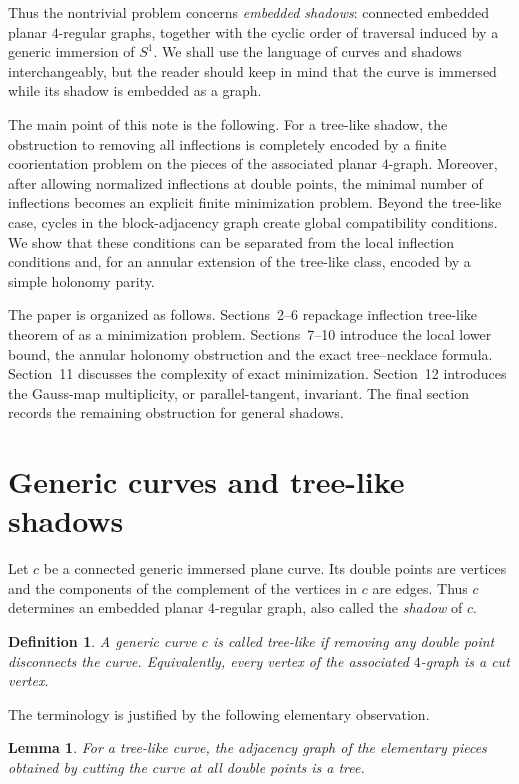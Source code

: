 \documentclass[11pt]{article}
\newtheorem{definition}[theorem]{Definition}
\newtheorem{lemma}[theorem]{Lemma}
\begin{document}
Thus the nontrivial problem concerns \emph{embedded shadows}: connected embedded planar $4$-regular graphs, together with the cyclic order of traversal induced by a generic immersion of $S^1$.  We shall use the language of curves and shadows interchangeably, but the reader should keep in mind that the curve is immersed while its shadow is embedded as a graph.

The main point of this note is the following.  For a tree-like shadow, the obstruction to removing all inflections is completely encoded by a finite coorientation problem on the pieces of the associated planar $4$-graph.  Moreover, after allowing normalized inflections at double points, the minimal number of inflections becomes an explicit finite minimization problem.  Beyond the tree-like case, cycles in the block-adjacency graph create global compatibility conditions.  We show that these conditions can be separated from the local inflection conditions and, for an annular extension of the tree-like class, encoded by a simple holonomy parity.

The paper is organized as follows.  Sections~2--6 repackage inflection tree-like theorem of \cite{ShapiroTree} as a minimization problem.  Sections~7--10 introduce the local lower bound, the annular holonomy obstruction and the exact tree--necklace formula.  Section~11 discusses the complexity of exact minimization.  Section~12 introduces the Gauss-map multiplicity, or parallel-tangent, invariant.  The final section records the remaining obstruction for general shadows.

\section{Generic curves and tree-like shadows}

Let $c$ be a connected generic immersed plane curve.  Its double points are vertices and the components of the complement of the vertices in $c$ are edges.  Thus $c$ determines an embedded planar $4$-regular graph, also called the \emph{shadow} of $c$.

\begin{definition}
A generic curve $c$ is called \emph{tree-like} if removing any double point disconnects the curve.  Equivalently, every vertex of the associated $4$-graph is a cut vertex.
\end{definition}

The terminology is justified by the following elementary observation.

\begin{lemma}
For a tree-like curve, the adjacency graph of the elementary pieces obtained by cutting the curve at all double points is a tree.
\end{lemma}
\end{document}
